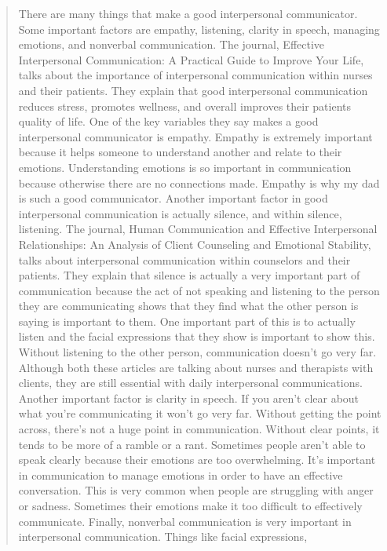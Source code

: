 \begin{quotation}
    There are many things that make a good interpersonal communicator. Some
      important factors are empathy, listening, clarity in speech, managing
      emotions, and nonverbal communication. The journal, Effective
      Interpersonal Communication: A Practical Guide to Improve Your Life,
      talks about the importance of interpersonal communication within nurses
      and their patients. They explain that good interpersonal communication
      reduces stress, promotes wellness, and overall improves their patients
      quality of life. One of the key variables they say makes a good
      interpersonal communicator is empathy. Empathy is extremely important
      because it helps someone to understand another and relate to their
      emotions. Understanding emotions is so important in communication because
      otherwise there are no connections made. Empathy is why my dad is such a
      good communicator. Another important factor in good interpersonal
      communication is actually silence, and within silence, listening. The
      journal, Human Communication and Effective Interpersonal Relationships: An
      Analysis of Client Counseling and Emotional Stability, talks about
      interpersonal communication within counselors and their patients. They
      explain that silence is actually a very important part of communication
      because the act of not speaking and listening to the person they are
      communicating shows that they find what the other person is saying is
      important to them. One important part of this is to actually listen and
      the facial expressions that they show is important to show this. Without
      listening to the other person, communication doesn't go very far. Although
      both these articles are talking about nurses and therapists with clients,
      they are still essential with daily interpersonal communications. Another
      important factor is clarity in speech. If you aren't clear about what
      you're communicating it won't go very far. Without getting the point
      across, there's not a huge point in communication. Without clear points,
      it tends to be more of a ramble or a rant. Sometimes people aren't able
      to speak clearly because their emotions are too overwhelming. It's
      important in communication to manage emotions in order to have an
      effective conversation. This is very common when people are struggling
      with anger or sadness. Sometimes their emotions make it too difficult to
      effectively communicate. Finally, nonverbal communication is very
      important in interpersonal communication. Things like facial expressions,

\end{quotation}
